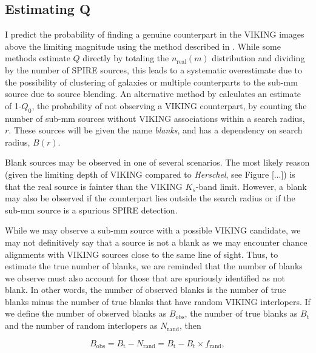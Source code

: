 \subsection{Estimating Q}

I predict the probability of finding a genuine counterpart in the VIKING images above the limiting magnitude using the method described in \citealt{Fleuren_2012}. While some methods estimate $Q$ directly by totaling the $n_{\textrm{real}}(m)$ distribution and dividing by the number of SPIRE sources, this leads to a systematic overestimate due to the possibility of clustering of galaxies or multiple counterparts to the sub-mm source due to source blending. An alternative method by \citealt{Fleuren_2012} calculates an estimate of 1-$Q_0$, the probability of not observing a VIKING counterpart, by counting the number of sub-mm sources without VIKING associations within a search radius, $r$. These sources will be given the name \textit{blanks}, and has a dependency on search radius, $B(r)$.

Blank sources may be observed in one of several scenarios. The most likely reason (given the limiting depth of VIKING compared to \textit{Herschel}, see Figure [...]) is that the real source is fainter than the VIKING $K_s$-band limit. However, a blank may also be observed if the counterpart lies outside the search radius or if the sub-mm source is a spurious SPIRE detection.

While we may observe a sub-mm source with a possible VIKING candidate, we may not definitively say that a source is not a blank as we may encounter chance alignments with VIKING sources close to the same line of sight. Thus, to estimate the true number of blanks, we are reminded that the number of blanks we observe must also account for those that are spuriously identified as not blank. In other words, the number of observed blanks is the number of true blanks minus the number of true blanks that have random VIKING interlopers. If we define the number of observed blanks as $B_{\textrm{obs}}$, the number of true blanks as $B_{\textrm{t}}$ and the number of random interlopers as $N_{\textrm{rand}}$, then

\begin{equation}
    B_{\textrm{obs}} = B_{\textrm{t}} - N_{\textrm{rand}} = B_{\textrm{t}} - B_{\textrm{t}} \times f_{\textrm{rand}},
\end{equation}

